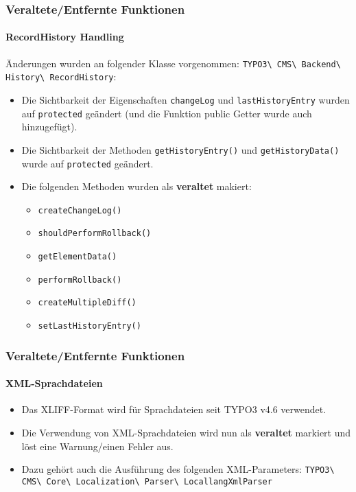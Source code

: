 
\begin{frame}[fragile]
	\frametitle{Veraltete/Entfernte Funktionen}
	\framesubtitle{RecordHistory Handling}

	Änderungen wurden an folgender Klasse vorgenommen:
		\smaller
			\texttt{TYPO3\textbackslash
				CMS\textbackslash
				Backend\textbackslash
				History\textbackslash
				RecordHistory}:
		\normalsize

	\begin{itemize}

		\item Die Sichtbarkeit der Eigenschaften \texttt{changeLog} und \texttt{lastHistoryEntry}
			wurden auf \texttt{protected} geändert (und die Funktion public Getter wurde auch hinzugefügt).
		\item Die Sichtbarkeit der Methoden \texttt{getHistoryEntry()} und \texttt{getHistoryData()}
			wurde auf \texttt{protected} geändert.
		\item Die folgenden Methoden wurden als \textbf{veraltet} makiert:

			\begin{itemize}\smaller
				\item \texttt{createChangeLog()}
				\item \texttt{shouldPerformRollback()}
				\item \texttt{getElementData()}
				\item \texttt{performRollback()}
				\item \texttt{createMultipleDiff()}
				\item \texttt{setLastHistoryEntry()}
			\end{itemize}\normalsize

	\end{itemize}

\end{frame}


\begin{frame}[fragile]
	\frametitle{Veraltete/Entfernte Funktionen}
	\framesubtitle{XML-Sprachdateien}

	\begin{itemize}
		\item Das XLIFF-Format wird für Sprachdateien seit TYPO3 v4.6 verwendet.
		\item Die Verwendung von XML-Sprachdateien wird nun als \textbf{veraltet}
			markiert und löst eine Warnung/einen Fehler aus.
		\item Dazu gehört auch die Ausführung des folgenden XML-Parameters:\newline
			\small
				\texttt{TYPO3\textbackslash
					CMS\textbackslash
					Core\textbackslash
					Localization\textbackslash
					Parser\textbackslash
					LocallangXmlParser}
			\normalsize
	\end{itemize}

\end{frame}

